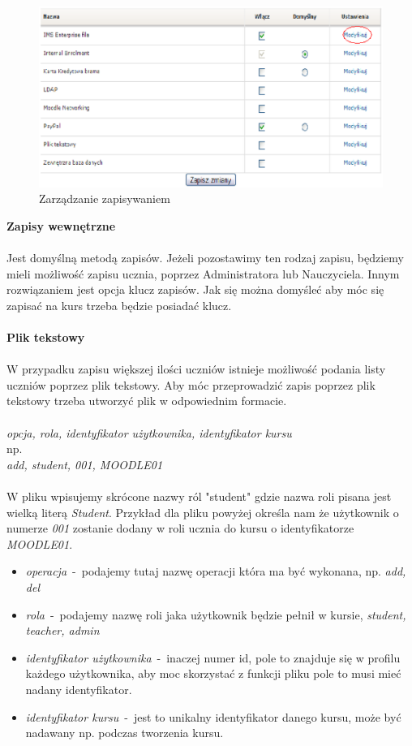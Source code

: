 \begin{figure}[!h]
	\centering
		\caption{Zarządzanie zapisywaniem} \label{rys:zapisy}
		\includegraphics[width=1\textwidth]{projekt_sys//rys//zapisy.eps}
\end{figure}
\textbf{Zapisy wewnętrzne} \\
\ \\
Jest domyślną metodą zapisów. Jeżeli pozostawimy ten rodzaj zapisu, będziemy mieli możliwość zapisu ucznia, poprzez Administratora lub Nauczyciela. Innym rozwiązaniem jest opcja klucz zapisów. Jak się można domyśleć aby móc się zapisać na kurs trzeba będzie posiadać klucz.\\
\ \\
\textbf{Plik tekstowy} \\
\ \\
W przypadku zapisu większej ilości uczniów istnieje możliwość podania listy uczniów poprzez plik tekstowy. Aby móc przeprowadzić zapis poprzez plik tekstowy trzeba utworzyć plik w odpowiednim formacie. \\
\ \\
\textit{opcja, rola, identyfikator użytkownika, identyfikator kursu}\\
np.\\
\textit{add, student, 001, MOODLE01} \\
\ \\
W pliku wpisujemy skrócone nazwy ról "student" gdzie nazwa roli pisana jest wielką literą \textit{Student}. Przykład dla pliku powyżej określa nam że użytkownik o numerze \textit{001} zostanie dodany w roli ucznia do kursu o identyfikatorze \textit{MOODLE01}.\\
\begin{itemize}
	\item \textit{operacja}~-~podajemy tutaj nazwę operacji która ma być wykonana, np. \textit{add, del}
	\item \textit{rola}~-~podajemy nazwę roli jaka użytkownik będzie pełnił w kursie, \textit{student, teacher, admin}
	\item \textit{identyfikator użytkownika}~-~inaczej numer id, pole to znajduje się w profilu każdego użytkownika, aby moc skorzystać z funkcji pliku pole to musi mieć nadany identyfikator.
	\item \textit{identyfikator kursu}~-~jest to unikalny identyfikator danego kursu, może być nadawany np. podczas tworzenia kursu.
\end{itemize}
